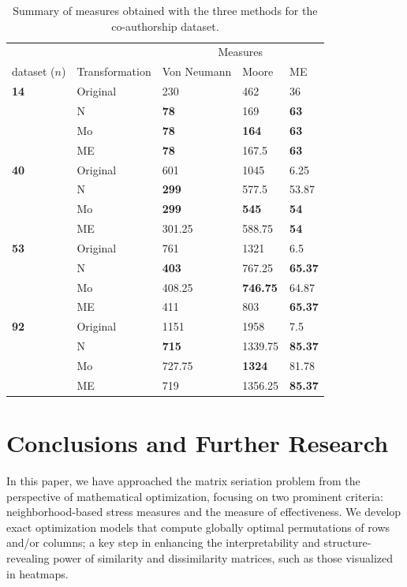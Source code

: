 \documentclass[a4paper,11pt, reqno]{amsart}
\begin{document}
\begin{table}
\centering
{\small\begin{tabular}{l l | l l l}
& & \multicolumn{3}{c}{Measures}\\
dataset ($n$) &  Transformation & Von Neumann & Moore & ME \\
\hline
\textbf{14} & Original & 230 & 462 & 36 \\
 & N & \textbf{78} & 169 & \textbf{63} \\
 & Mo &\textbf{78} & \textbf{164} & \textbf{63} \\
 & ME & \textbf{78} & 167.5 & \textbf{63} \\
\textbf{40} & Original & 601 & 1045 & 6.25 \\
 & N & \textbf{299} & 577.5 & 53.87 \\
 & Mo & \textbf{299} & \textbf{545} & \textbf{54} \\
 & ME & 301.25 & 588.75 & \textbf{54} \\
\textbf{53} & Original & 761 & 1321 & 6.5 \\
 & N & \textbf{403} & 767.25 & \textbf{65.37} \\
 & Mo & 408.25 & \textbf{746.75} & 64.87 \\
 & ME & 411 & 803 & \textbf{65.37} \\
\textbf{92} & Original & 1151 & 1958 & 7.5 \\
 & N & \textbf{715} & 1339.75 & \textbf{85.37} \\
 & Mo & 727.75 & \textbf{1324} & 81.78 \\
 & ME & 719 & 1356.25 & \textbf{85.37}\\\hline
\end{tabular}}
\caption{Summary of measures obtained with the three methods for the co-authorship dataset.\label{ultima}} 
\end{table}

\section{Conclusions and Further Research}

In this paper, we have approached the matrix seriation problem from the perspective of mathematical optimization, focusing on two prominent criteria: neighborhood-based stress measures and the measure of effectiveness. We develop exact optimization models that compute globally optimal permutations of rows and/or columns; a key step in enhancing the interpretability and structure-revealing power of similarity and dissimilarity matrices, such as those visualized in heatmaps.
\end{document}
